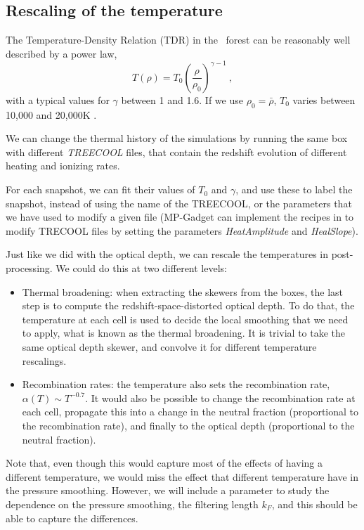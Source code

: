 \subsection{Rescaling of the temperature}

The Temperature-Density Relation (TDR) in the \lya\ forest can be reasonably
well described by a power law, 
\begin{equation}
 T(\rho) = T_0 \left(\frac{\rho}{\rho_0}\right)^{\gamma-1} ~,
\end{equation}
with a typical values for $\gamma$ between 1 and 1.6. 
If we use $\rho_0 = \bar \rho$, $T_0$ varies between 10,000 and 20,000K
\cite{Lukic2015}.

We can change the thermal history of the simulations by running the same box
with different \textit{TREECOOL} files, that contain the redshift evolution
of different heating and ionizing rates.

For each snapshot, we can fit their values of $T_0$ and $\gamma$, and use 
these to label the snapshot, instead of using the name of the TREECOOL, 
or the parameters that we have used to modify a given file 
(MP-Gadget can implement the recipes in \cite{Bolton2008} to modify TRECOOL
files by setting the parameters \textit{HeatAmplitude} and \textit{HealSlope}).

Just like we did with the optical depth, we can rescale the temperatures in 
post-processing. 
We could do this at two different levels:
\begin{itemize}
 \item Thermal broadening: when extracting the skewers from the boxes, 
  the last step is to compute the redshift-space-distorted optical depth. 
  To do that, the temperature at each cell is used to decide the local 
  smoothing that we need to apply, what is known as the thermal broadening. 
  It is trivial to take the same optical depth skewer, and convolve it for
  different temperature rescalings.
 \item Recombination rates: the temperature also sets the recombination rate,
  $\alpha(T) \sim T^{-0.7}$. 
  It would also be possible to change the recombination rate at each cell, 
  propagate this into a change in the neutral fraction (proportional to the 
  recombination rate), and finally to the optical depth (proportional to the 
  neutral fraction). 
\end{itemize}

Note that, even though this would capture most of the effects of having a 
different temperature, we would miss the effect that different temperature
have in the pressure smoothing.
However, we will include a parameter to study the dependence on the pressure
smoothing, the filtering length $k_F$, and this should be able to capture
the differences.


